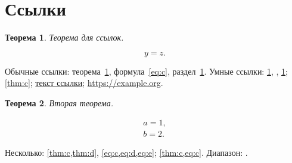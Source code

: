 \documentclass[12pt]{article}
\newtheorem{theorem}{Теорема}[section]
\begin{document}
\section{Ссылки}\label{sec:refs}

\begin{theorem}\label{thm:c}
Теорема для ссылок.
\end{theorem}

\begin{equation}\label{eq:c}
  y = z .
\end{equation}

Обычные ссылки: теорема~\ref{thm:c}, формула~\eqref{eq:c}, раздел~\ref{sec:refs}.
Умные ссылки: \cref{thm:c}, , \cref{sec:refs}; \autoref{thm:c};
\hyperref[thm:c]{текст ссылки}; \url{https://example.org}.

\begin{theorem}\label{thm:d}
Вторая теорема.
\end{theorem}
\begin{gather}
  a = 1, \label{eq:d}\\
  b = 2. \label{eq:e}
\end{gather}

Несколько: \cref{thm:c,thm:d}, \cref{eq:c,eq:d,eq:e}; \cref{thm:c,eq:c}.
Диапазон: .
\end{document}
